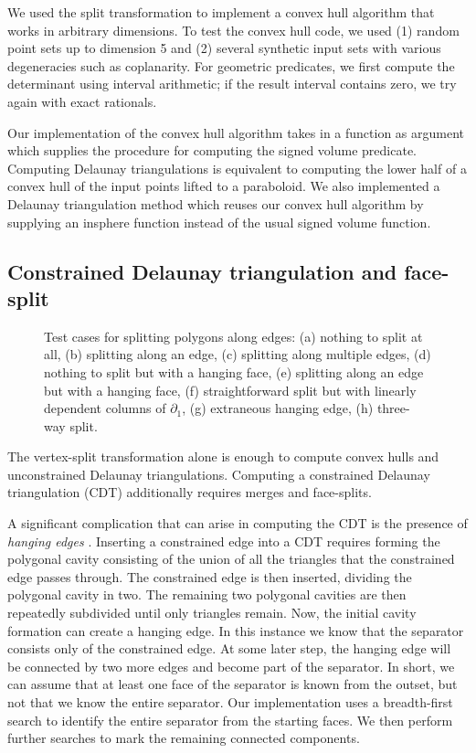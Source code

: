 \documentclass[twocolumn]{article}
\begin{document}
We used the split transformation to implement a convex hull algorithm that works in arbitrary dimensions.
To test the convex hull code, we used (1) random point sets up to dimension 5 and (2) several synthetic input sets with various degeneracies such as coplanarity.
For geometric predicates, we first compute the determinant using interval arithmetic; if the result interval contains zero, we try again with exact rationals.

Our implementation of the convex hull algorithm takes in a function as argument which supplies the procedure for computing the signed volume predicate.
Computing Delaunay triangulations is equivalent to computing the lower half of a convex hull of the input points lifted to a paraboloid.
We also implemented a Delaunay triangulation method which reuses our convex hull algorithm by supplying an insphere function instead of the usual signed volume function.

\subsection{Constrained Delaunay triangulation and face-split}

\begin{figure}[t]
    \begin{center}
        
    \end{center}
    \caption{Test cases for splitting polygons along edges: (a) nothing to split at all, (b) splitting along an edge, (c) splitting along multiple edges, (d) nothing to split but with a hanging face, (e) splitting along an edge but with a hanging face, (f) straightforward split but with linearly dependent columns of $\partial_1$, (g) extraneous hanging edge, (h) three-way split.}
    \label{fig:face-split-tests}
\end{figure}

The vertex-split transformation alone is enough to compute convex hulls and unconstrained Delaunay triangulations.
Computing a constrained Delaunay triangulation (CDT) additionally requires merges and face-splits.

A significant complication that can arise in computing the CDT is the presence of \emph{hanging edges} \cite{cheng2013delaunay}.
Inserting a constrained edge into a CDT requires forming the polygonal cavity consisting of the union of all the triangles that the constrained edge passes through.
The constrained edge is then inserted, dividing the polygonal cavity in two.
The remaining two polygonal cavities are then repeatedly subdivided until only triangles remain.
Now, the initial cavity formation can create a hanging edge.
In this instance we know that the separator consists only of the constrained edge.
At some later step, the hanging edge will be connected by two more edges and become part of the separator.
In short, we can assume that at least one face of the separator is known from the outset, but not that we know the entire separator.
Our implementation uses a breadth-first search to identify the entire separator from the starting faces.
We then perform further searches to mark the remaining connected components.
\end{document}
